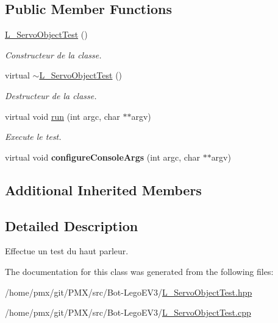 \subsection*{Public Member Functions}
\begin{DoxyCompactItemize}
\item 
\mbox{\label{classL__ServoObjectTest_a4075ff2a756016ecf1af240488639fa6}} 
\hyperlink{classL__ServoObjectTest_a4075ff2a756016ecf1af240488639fa6}{L\+\_\+\+Servo\+Object\+Test} ()
\begin{DoxyCompactList}\small\item\em Constructeur de la classe. \end{DoxyCompactList}\item 
\mbox{\label{classL__ServoObjectTest_a65e9fd08446baf7966e8c13511739663}} 
virtual \hyperlink{classL__ServoObjectTest_a65e9fd08446baf7966e8c13511739663}{$\sim$\+L\+\_\+\+Servo\+Object\+Test} ()
\begin{DoxyCompactList}\small\item\em Destructeur de la classe. \end{DoxyCompactList}\item 
\mbox{\label{classL__ServoObjectTest_adbf78503aa8a5f23673ff10bcd924a84}} 
virtual void \hyperlink{classL__ServoObjectTest_adbf78503aa8a5f23673ff10bcd924a84}{run} (int argc, char $\ast$$\ast$argv)
\begin{DoxyCompactList}\small\item\em Execute le test. \end{DoxyCompactList}\item 
\mbox{\label{classL__ServoObjectTest_ad6589454afbc8e749e511ef8d81616ed}} 
virtual void {\bfseries configure\+Console\+Args} (int argc, char $\ast$$\ast$argv)
\end{DoxyCompactItemize}
\subsection*{Additional Inherited Members}


\subsection{Detailed Description}
Effectue un test du haut parleur. 

The documentation for this class was generated from the following files\+:\begin{DoxyCompactItemize}
\item 
/home/pmx/git/\+P\+M\+X/src/\+Bot-\/\+Lego\+E\+V3/\hyperlink{L__ServoObjectTest_8hpp}{L\+\_\+\+Servo\+Object\+Test.\+hpp}\item 
/home/pmx/git/\+P\+M\+X/src/\+Bot-\/\+Lego\+E\+V3/\hyperlink{L__ServoObjectTest_8cpp}{L\+\_\+\+Servo\+Object\+Test.\+cpp}\end{DoxyCompactItemize}
